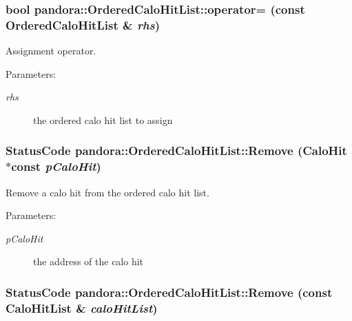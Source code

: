 \subsubsection{\setlength{\rightskip}{0pt plus 5cm}bool pandora::Ordered\-Calo\-Hit\-List::operator= (const \bf{Ordered\-Calo\-Hit\-List} \& {\em rhs})}\label{classpandora_1_1OrderedCaloHitList_4029243017c572074785b2bea0aa69d6}


Assignment operator. 

\begin{Desc}
\item[Parameters:]
\begin{description}
\item[{\em rhs}]the ordered calo hit list to assign \end{description}
\end{Desc}
\subsubsection{\setlength{\rightskip}{0pt plus 5cm}Status\-Code pandora::Ordered\-Calo\-Hit\-List::Remove (\bf{Calo\-Hit} $\ast$const  {\em p\-Calo\-Hit})\hspace{0.3cm}{\tt  [inline]}}\label{classpandora_1_1OrderedCaloHitList_2b557eff78d3da386d4bf4564159dfcb}


Remove a calo hit from the ordered calo hit list. 

\begin{Desc}
\item[Parameters:]
\begin{description}
\item[{\em p\-Calo\-Hit}]the address of the calo hit \end{description}
\end{Desc}
\subsubsection{\setlength{\rightskip}{0pt plus 5cm}Status\-Code pandora::Ordered\-Calo\-Hit\-List::Remove (const Calo\-Hit\-List \& {\em calo\-Hit\-List})}\label{classpandora_1_1OrderedCaloHitList_479887b113c6694c935a7738a266fbc8}


